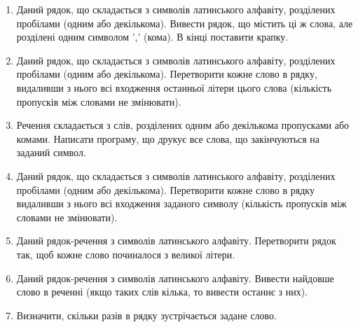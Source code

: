 \documentclass[a5paper,titlepage,openany,twoside,draft]{book_unv}%
\begin{document}
\begin{enumerate}
\def\labelenumi{\arabic{enumi})}
\setcounter{enumi}{8}
\item
  Даний рядок, що складається з символів латинського алфавіту,
  розділених пробілами (одним або декількома). Вивести рядок, що містить
  ці ж слова, але розділені одним символом ',' (кома). В кінці
  поставити крапку.
\item
  Даний рядок, що складається з символів латинського алфавіту,
  розділених пробілами (одним або декількома). Перетворити кожне слово в
  рядку, видаливши з нього всі входження останньої літери цього слова
  (кількість пропусків між словами не змінювати).
\item
  Речення складається з слів, розділених одним або декількома
  пропусками або комами. Написати програму, що друкує все слова, що закінчуються на
  заданий символ.
\item
  Даний рядок, що складається з символів латинського алфавіту,
  розділених пробілами (одним або декількома). Перетворити кожне слово в
  рядку видаливши з нього всі входження заданого символу (кількість
  пропусків між словами не змінювати).
\item
  Даний рядок-речення з символів латинського алфавіту. Перетворити рядок
  так, щоб кожне слово починалося з великої літери.
\item
  Даний рядок-речення з символів латинського алфавіту. Вивести найдовше
  слово в реченні (якщо таких слів кілька, то вивести останнє з них).
\item
  Визначити, скільки разів в рядку зустрічається задане слово.


\end{enumerate}
\end{document}

